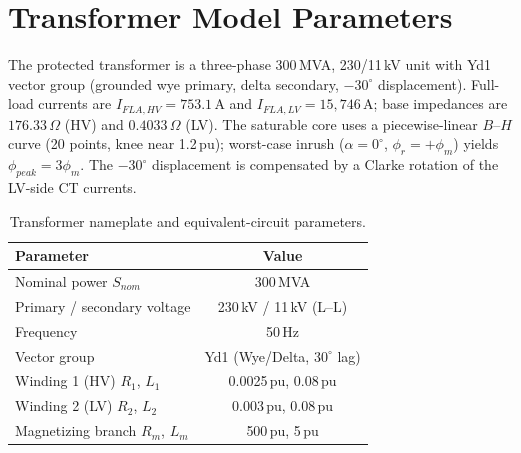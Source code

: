 \documentclass[12pt,a4paper,oneside]{report}
\begin{document}
\section{Transformer Model Parameters}
The protected transformer is a three-phase 300\,MVA, 230/11\,kV unit with Yd1 vector group (grounded wye primary, delta secondary, $-30^\circ$ displacement). Full-load currents are $I_{FLA,HV}=753.1$\,A and $I_{FLA,LV}=15{,}746$\,A; base impedances are $176.33\,\Omega$ (HV) and $0.4033\,\Omega$ (LV). The saturable core uses a piecewise-linear $B$--$H$ curve (20 points, knee near 1.2\,pu); worst-case inrush ($\alpha=0^\circ$, $\phi_r=+\phi_m$) yields $\phi_{peak}=3\phi_m$. The $-30^\circ$ displacement is compensated by a Clarke rotation of the LV-side CT currents.
\begin{table}[H]\centering\caption{Transformer nameplate and equivalent-circuit parameters.}\label{tab:4.1}
\begin{tabular}{@{}lc@{}}\toprule \textbf{Parameter} & \textbf{Value}\\ \midrule
Nominal power $S_{nom}$ & 300\,MVA\\
Primary / secondary voltage & 230\,kV / 11\,kV (L--L)\\
Frequency & 50\,Hz\\
Vector group & Yd1 (Wye/Delta, $30^\circ$ lag)\\
Winding 1 (HV) $R_1$, $L_1$ & 0.0025\,pu, 0.08\,pu\\
Winding 2 (LV) $R_2$, $L_2$ & 0.003\,pu, 0.08\,pu\\
Magnetizing branch $R_m$, $L_m$ & 500\,pu, 5\,pu\\ \bottomrule
\end{tabular}\end{table}
\end{document}
